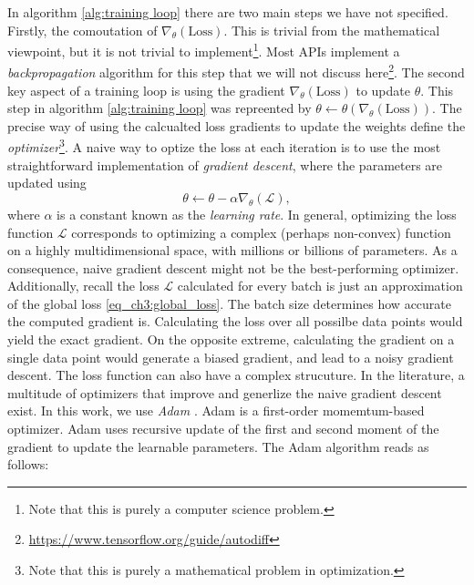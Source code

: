 In algorithm \ref{alg:training loop} there are two main steps we have not specified. Firstly, the comoutation of $\nabla_\theta (\text{Loss})$. This is trivial from the mathematical viewpoint, but it is not trivial to implement\footnote{Note that this is purely a computer science problem.}. Most APIs implement a \emph{backpropagation} algorithm for this step that we will not discuss here\footnote{\url{https://www.tensorflow.org/guide/autodiff}}. The second key aspect of a training loop is using the gradient $\nabla_\theta (\text{Loss})$ to update $\theta$. This step in algorithm \ref{alg:training loop} was repreented by $\theta \gets \theta(\nabla_\theta (\text{Loss}))$. The precise way of using the calcualted loss gradients to update the weights define the \emph{optimizer}\footnote{Note that this is purely a mathematical problem in optimization.}. A naive way to optize the loss at each iteration is to use the most straightforward implementation of \emph{gradient descent}, where the parameters are updated using
\begin{equation}
    \theta \gets \theta - \alpha \nabla_\theta (\mathcal{L}),
\end{equation}
where $\alpha$ is a constant known as the \emph{learning rate}. In general, optimizing the loss function $\mathcal{L}$ corresponds to optimizing a complex (perhaps non-convex) function on a highly multidimensional space, with millions or billions of parameters. As a consequence, naive gradient descent might not be the best-performing optimizer. Additionally, recall the loss $\mathcal{L}$ calculated for every batch is just an approximation of the global loss \ref{eq_ch3:global_loss}. The batch size determines how accurate the computed gradient is. Calculating the loss over all possilbe data points would yield the exact gradient. On the opposite extreme, calculating the gradient on a single data point would generate a biased gradient, and lead to a noisy gradient descent. The loss function can also have a complex strucuture. In the literature, a multitude of optimizers that improve and generlize the naive gradient descent exist. In this work, we use \emph{Adam} \cite{adam}. Adam is a first-order momemtum-based optimizer. Adam uses recursive update of the first and second moment of the gradient to update the learnable parameters. The Adam algorithm reads as follows:

